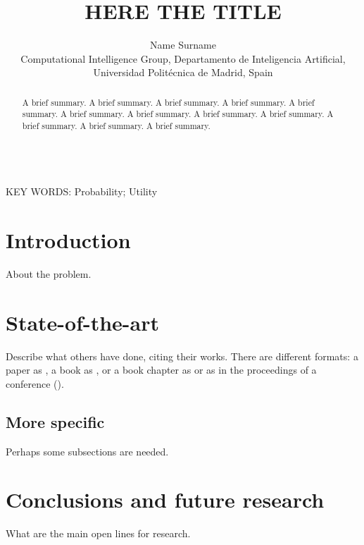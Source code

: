 \documentclass[a4paper,11pt]{article}
\begin{document}
\title{HERE THE TITLE}

\author{{Name Surname}\\
{\small Computational Intelligence Group, Departamento de Inteligencia Artificial, Universidad Polit\'ecnica de Madrid, Spain}}

\date{}
\maketitle



\begin{abstract} A brief summary. A brief summary. A brief summary. A brief summary. A brief summary. A brief summary. A brief summary. A brief summary. A brief summary. A brief summary. A brief summary. A brief summary.
\end{abstract}


\ \\
KEY WORDS: Probability; Utility




\section{Introduction}

About the problem.



\section{State-of-the-art}

Describe what others have done, citing their works. There are different formats: a paper as \cite{uncu2007}, a book as \cite{hosmer-lemeshow2000}, or a book chapter as \cite{wold75} or as in the proceedings of a conference (\cite{shakhnarovich2001icml}).

    \subsection{More specific}


Perhaps some subsections are needed.

\section{Conclusions and future research}

What are the main open lines for research.
\end{document}
